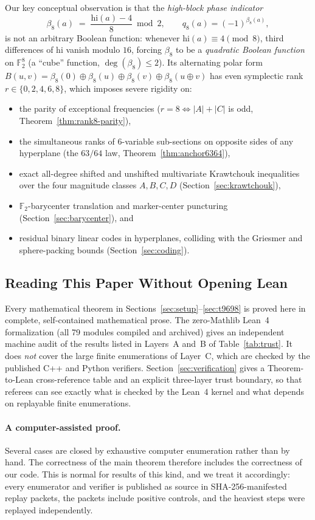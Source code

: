 \documentclass[11pt]{article}
\theoremstyle{definition}
\newcommand{\F}{\mathbb{F}}
\begin{document}
Our key conceptual observation is that the \emph{high-block phase indicator}
\[
  \beta_8(a) \;=\; \frac{\mathrm{hi}(a) - 4}{8} \bmod 2, \qquad q_8(a) = (-1)^{\beta_8(a)},
\]
is not an arbitrary Boolean function: whenever $\mathrm{hi}(a) \equiv 4 \pmod 8$, third differences of $\mathrm{hi}$ vanish modulo $16$, forcing $\beta_8$ to be a \emph{quadratic Boolean function} on $\F_2^8$ (a ``cube'' function, $\deg(\beta_8) \le 2$).
Its alternating polar form $B(u, v) = \beta_8(0) \oplus \beta_8(u) \oplus \beta_8(v) \oplus \beta_8(u \oplus v)$ has even symplectic rank $r \in \{0, 2, 4, 6, 8\}$, which imposes severe rigidity on:
\begin{itemize}[nosep]
  \item the parity of exceptional frequencies ($r = 8 \iff |A| + |C|$ is odd, Theorem~\ref{thm:rank8-parity}),
  \item the simultaneous ranks of $6$-variable sub-sections on opposite sides of any hyperplane (the $63/64$ law, Theorem~\ref{thm:anchor6364}),
  \item exact all-degree shifted and unshifted multivariate Krawtchouk inequalities over the four magnitude classes $A, B, C, D$ (Section~\ref{sec:krawtchouk}),
  \item $\F_2$-barycenter translation and marker-center puncturing (Section~\ref{sec:barycenter}), and
  \item residual binary linear codes in hyperplanes, colliding with the Griesmer and sphere-packing bounds (Section~\ref{sec:coding}).
\end{itemize}

\subsection{Reading This Paper Without Opening Lean}
Every mathematical theorem in Sections~\ref{sec:setup}--\ref{sec:t9698} is proved here in complete, self-contained mathematical prose.
The zero-Mathlib Lean~4 formalization (all 79 modules compiled and archived) gives an independent machine audit of the results listed in Layers~A and~B of Table~\ref{tab:trust}. It does \emph{not} cover the large finite enumerations of Layer~C, which are checked by the published C++ and Python verifiers.
Section~\ref{sec:verification} gives a Theorem-to-Lean cross-reference table and an explicit three-layer trust boundary, so that referees can see exactly what is checked by the Lean~4 kernel and what depends on replayable finite enumerations.

\paragraph{A computer-assisted proof.}
Several cases are closed by exhaustive computer enumeration rather than by hand. The correctness of the main theorem therefore includes the correctness of our code. This is normal for results of this kind, and we treat it accordingly: every enumerator and verifier is published as source in SHA-256-manifested replay packets, the packets include positive controls, and the heaviest steps were replayed independently.
\end{document}
